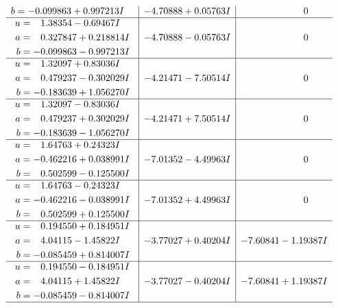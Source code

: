 \documentclass[1p]{elsarticle_modified}
\theoremstyle{definition}
\begin{document}
$$\begin{array}{c|c|c}
\begin{aligned}
b &= -0.099863 + 0.997213 I\end{aligned}
 & -4.70888 + 0.05763 I & \phantom{-0.000000 } 0 \\ \hline\begin{aligned}
u &= \phantom{-}1.38354 - 0.69467 I \\
a &= \phantom{-}0.327847 + 0.218814 I \\
b &= -0.099863 - 0.997213 I\end{aligned}
 & -4.70888 - 0.05763 I & \phantom{-0.000000 } 0 \\ \hline\begin{aligned}
u &= \phantom{-}1.32097 + 0.83036 I \\
a &= \phantom{-}0.479237 - 0.302029 I \\
b &= -0.183639 + 1.056270 I\end{aligned}
 & -4.21471 - 7.50514 I & \phantom{-0.000000 } 0 \\ \hline\begin{aligned}
u &= \phantom{-}1.32097 - 0.83036 I \\
a &= \phantom{-}0.479237 + 0.302029 I \\
b &= -0.183639 - 1.056270 I\end{aligned}
 & -4.21471 + 7.50514 I & \phantom{-0.000000 } 0 \\ \hline\begin{aligned}
u &= \phantom{-}1.64763 + 0.24323 I \\
a &= -0.462216 + 0.038991 I \\
b &= \phantom{-}0.502599 - 0.125500 I\end{aligned}
 & -7.01352 - 4.49963 I & \phantom{-0.000000 } 0 \\ \hline\begin{aligned}
u &= \phantom{-}1.64763 - 0.24323 I \\
a &= -0.462216 - 0.038991 I \\
b &= \phantom{-}0.502599 + 0.125500 I\end{aligned}
 & -7.01352 + 4.49963 I & \phantom{-0.000000 } 0 \\ \hline\begin{aligned}
u &= \phantom{-}0.194550 + 0.184951 I \\
a &= \phantom{-}4.04115 - 1.45822 I \\
b &= -0.085459 + 0.814007 I\end{aligned}
 & -3.77027 + 0.40204 I & -7.60841 - 1.19387 I \\ \hline\begin{aligned}
u &= \phantom{-}0.194550 - 0.184951 I \\
a &= \phantom{-}4.04115 + 1.45822 I \\
b &= -0.085459 - 0.814007 I\end{aligned}
 & -3.77027 - 0.40204 I & -7.60841 + 1.19387 I\\
 \hline 
 \end{array}$$\newpage\newpage\renewcommand{\arraystretch}{1}
\end{document}
